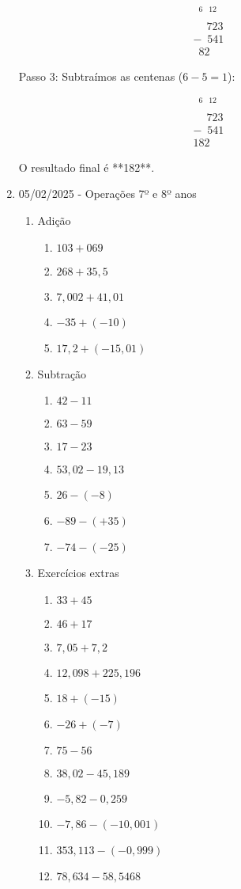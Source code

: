 \begin{enumerate}
	\[
	\begin{array}{r}
		\phantom{1}^6 \phantom{1}^{12} \\
		\phantom{-}723 \\
		- \phantom{0}541 \\
		\hline
		\phantom{0} 8 2
	\end{array}
	\]
	
	Passo 3: Subtraímos as centenas (\(6 - 5 = 1\)):
	
	\[
	\begin{array}{r}
		\phantom{1}^6 \phantom{1}^{12} \\
		\phantom{-}723 \\
		- \phantom{0}541 \\
		\hline
		1 8 2
	\end{array}
	\]
	
	O resultado final é **182**.
	
	\item 05/02/2025 - Operações 7º e 8º anos
	
	\begin{enumerate}
		\item Adição
			\begin{enumerate}
				\item $103 + 069$
				\item $268 + 35,5$
				\item $7,002 + 41,01$
				\item $-35+(-10)$
				\item $17,2+(-15,01)$
			\end{enumerate}
		\item Subtração
			\begin{enumerate}
				\item $42 - 11$
				\item $63 - 59$
				\item $17 - 23$
				\item $53,02-19,13$
				\item $26-(-8)$
				\item $-89-(+35)$
				\item $-74-(-25)$
			\end{enumerate}
		\item Exercícios extras
		\begin{enumerate}
			\item $33+45$
			\item $46+17$
			\item $7,05 + 7,2$
			\item $12,098 + 225,196$
			\item $18 + (-15)$
			\item $-26 + (-7)$
			\item $75 - 56$
			\item $38,02 - 45,189$
			\item $-5,82-0,259$
			\item $-7,86-(-10,001)$
			\item $353,113-(-0,999)$
			\item $78,634-58,5468$
		\end{enumerate}
			

\end{enumerate}
\end{enumerate}
